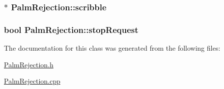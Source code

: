 \label{classPalmRejection_a80fc5d64b9940d255d1ae0103d2728c5}
\hypertarget{classPalmRejection_a8aceeaa0e01f8c54e89456567eec6ed7}{
\subsubsection[{scribble}]{$\ast$ {\bf PalmRejection::scribble}}}
\label{classPalmRejection_a8aceeaa0e01f8c54e89456567eec6ed7}
\hypertarget{classPalmRejection_a654fb0955480511cebd26e5b70fd0fb5}{
\subsubsection[{stopRequest}]{\setlength{\rightskip}{0pt plus 5cm}bool {\bf PalmRejection::stopRequest}}}
\label{classPalmRejection_a654fb0955480511cebd26e5b70fd0fb5}


The documentation for this class was generated from the following files:\begin{DoxyCompactItemize}
\item 
\hyperlink{PalmRejection_8h}{PalmRejection.h}\item 
\hyperlink{PalmRejection_8cpp}{PalmRejection.cpp}\end{DoxyCompactItemize}
